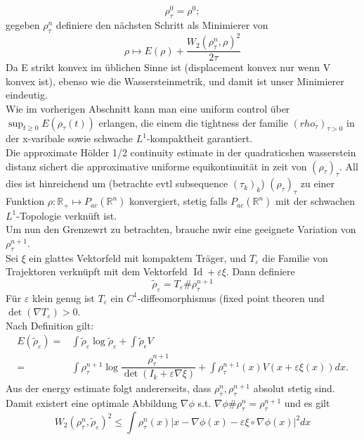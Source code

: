 \documentclass[11pt,a4paper,notitlepage]{scrreprt}
\newcommand{\RR}{\mathbb{R}}
\begin{document}
\[\rho_\tau^0=\rho^0; \]
gegeben $\rho_\tau^n$ definiere den nächsten Schritt als Minimierer von
\begin{equation*} \rho \mapsto E(\rho)+\dfrac{W_2(\rho_\tau^n,\rho)^2}{2\tau}
\end{equation*}
Da E strikt konvex im üblichen Sinne ist (displacement konvex nur wenn V konvex ist), ebenso wie die Wassersteinmetrik, und damit ist unser Minimierer eindeutig. \\
Wie im vorherigen Abschnitt kann man eine uniform control über $\sup_{t\geq 0} E(\rho_\tau(t))$ erlangen, die einem die tightness der familie $(rho_\tau)_{\tau >0}$ in der x-varibale sowie schwache $L^1$-kompaktheit garantiert. \\
Die approximate Hölder 1/2 continuity estimate in der quadraticshen wasserstein distanz sichert die approximative uniforme equikontinuität in zeit von $(\rho_\tau)_\tau$. All dies ist hinreichend um (betrachte evtl subsequence $(\tau_k)_k$) $(\rho_\tau)_\tau$ zu einer Funktion $\rho: \RR_+ \mapsto P_{ac}(\RR^n)$ konvergiert, stetig falls $P_{ac}(\RR^n)$ mit der schwachen $L^1$-Topologie verknüft ist. \\
Um nun den Grenzewrt zu betrachten, brauche nwir eine geeignete Variation von $\rho_\tau^{n+1}$.\\
Sei $\xi$ ein glattes Vektorfeld mit kompaktem Träger, und $T_\varepsilon$ die Familie von Trajektoren verknüpft mit dem Vektorfeld $\operatorname{Id} +\varepsilon\xi$. Dann definiere
\[\tilde{\rho}_\varepsilon=T_\varepsilon \#\rho_\tau^{n+1} \]
Für $\varepsilon$ klein genug ist $T_\varepsilon$ ein $C^1$-diffeomorphismus (fixed point theoren und $\det(\nabla T_\varepsilon)>0$.\\
Nach Definition gilt:
\begin{eqnarray}
E(\tilde{\rho}_\varepsilon)=&\int\tilde{\rho}_\varepsilon\log\tilde{\rho}_\varepsilon+\int\tilde{\rho}_\epsilon V\\
=&\int \rho_\tau^{n+1}\log\dfrac{\rho_\tau^{n+1}}{\det(I_k+\varepsilon \nabla \xi)}+\int \rho_\tau^{n+1}(x)V(x+\varepsilon\xi(x))dx.
\end{eqnarray}
Aus der energy estimate folgt andererseits, dass $\rho_\tau^n, \rho_\tau^{n+1}$ absolut stetig sind. Damit existert eine optimale Abbildung $\nabla \phi$ s.t. $\nabla \phi \# \rho_\tau^n=\rho_\tau^{n+1}$ und es gilt
\begin{equation*}
W_2(\rho_\tau^n,\tilde{\rho}_\varepsilon)^2 \leq \int \rho_\tau^n(x)\vert x-\nabla \phi(x)-\varepsilon\xi\circ\nabla\phi(x)\vert^2dx
\end{equation*}
\end{document}
